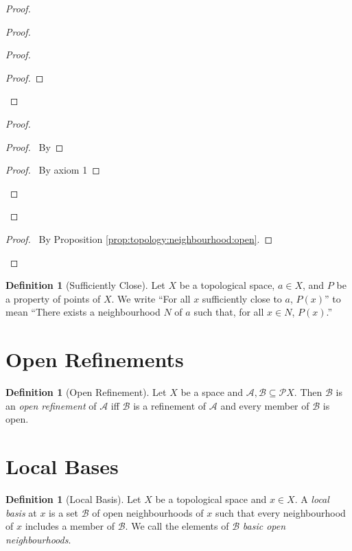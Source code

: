 \documentclass{report}
\let\qed\relax
\theoremstyle{definition}
\newtheorem{df}[lm]{Definition}
\begin{document}
\begin{proof}
\begin{proof}
\begin{proof}
\begin{proof}
        \end{proof}
      \end{proof}
      \begin{proof}
        \begin{proof}
          \pf\ By 
        \end{proof}
        \begin{proof}
          \pf\ By axiom 1
        \end{proof}
      \end{proof}
    \end{proof}
    \begin{proof}
      \pf\ By Proposition \ref{prop:topology:neighbourhood:open}.
    \end{proof}
    \qed
  \end{proof}

  \begin{df}[Sufficiently Close]
    Let $X$ be a topological space, $a \in X$, and $P$ be a property of points
    of $X$. We write ``For all $x$ sufficiently close to $a$, $P(x)$'' to mean
    ``There exists a neighbourhood $N$ of $a$ such that, for all $x \in N$,
    $P(x)$.''
  \end{df}

  \section{Open Refinements}

  \begin{df}[Open Refinement]
    Let $X$ be a space and $\mathcal{A}, \mathcal{B} \subseteq \mathcal{P} X$. Then $\mathcal{B}$ is an \emph{open refinement} of $\mathcal{A}$ iff $\mathcal{B}$ is a refinement of $\mathcal{A}$ and every member of $\mathcal{B}$ is open.
  \end{df}

  \section{Local Bases}

  \begin{df}[Local Basis]
    Let $X$ be a topological space and $x \in X$. A \emph{local basis} at $x$
    is a set $\mathcal{B}$ of open neighbourhoods of $x$ such that every
    neighbourhood of $x$ includes a member of $\mathcal{B}$. We call the
    elements of $\mathcal{B}$ \emph{basic open neighbourhoods}.
  \end{df}
\end{document}
